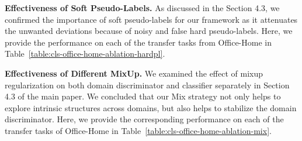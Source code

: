 \documentclass[10pt,twocolumn,letterpaper]{article}
\begin{document}
\vspace{1mm}
\noindent
\textbf{Effectiveness of Soft Pseudo-Labels.}
As discussed in the Section 4.3, we confirmed the importance of soft pseudo-labels for our framework as it attenuates the unwanted deviations because of noisy and false hard pseudo-labels. Here, we provide the performance on each of the transfer tasks from Office-Home in Table~\ref{table:cls-office-home-ablation-hardpl}.

\vspace{1mm}
\noindent
\textbf{Effectiveness of Different MixUp.} 
We examined the effect of mixup regularization on both domain discriminator and classifier separately in Section 4.3 of the main paper. We concluded that our Mix strategy not only helps to explore intrinsic structures across domains, but also helps
to stabilize the domain discriminator. Here, we provide the corresponding performance on each of the transfer tasks of Office-Home in Table~\ref{table:cls-office-home-ablation-mix}.
 
\end{document}
